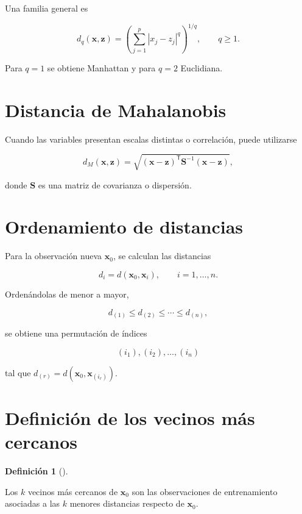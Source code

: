 \documentclass[
  spanish,
  11pt,
  letterpaper,
  DIV=11,
  numbers=noendperiod]{scrreprt}
\theoremstyle{definition}
\newtheorem{definition}{Definición}[chapter]
\theoremstyle{plain}
\theoremstyle{definition}
\theoremstyle{remark}
\begin{document}
Una familia general es

\[
d_q(\mathbf{x},\mathbf{z})
=
\left(
\sum_{j=1}^{p}|x_j-z_j|^q
\right)^{1/q},
\qquad q\ge 1.
\]

Para \(q=1\) se obtiene Manhattan y para \(q=2\) Euclidiana.

\section{Distancia de Mahalanobis}\label{distancia-de-mahalanobis}

Cuando las variables presentan escalas distintas o correlación, puede
utilizarse

\[
d_M(\mathbf{x},\mathbf{z})
=
\sqrt{
(\mathbf{x}-\mathbf{z})^{\mathsf T}
\mathbf{S}^{-1}
(\mathbf{x}-\mathbf{z})
},
\]

donde \(\mathbf{S}\) es una matriz de covarianza o dispersión.

\section{Ordenamiento de distancias}\label{ordenamiento-de-distancias}

Para la observación nueva \(\mathbf{x}_0\), se calculan las distancias

\[
d_i=d(\mathbf{x}_0,\mathbf{x}_i),
\qquad i=1,\ldots,n.
\]

Ordenándolas de menor a mayor,

\[
d_{(1)}\le d_{(2)}\le\cdots\le d_{(n)},
\]

se obtiene una permutación de índices

\[
(i_1),(i_2),\ldots,(i_n)
\]

tal que \(d_{(r)}=d(\mathbf{x}_0,\mathbf{x}_{(i_r)})\).

\section{Definición de los vecinos más
cercanos}\label{definiciuxf3n-de-los-vecinos-muxe1s-cercanos}

\begin{definition}[]\protect\hypertarget{def-vecinos}{}\label{def-vecinos}

Los \(k\) vecinos más cercanos de \(\mathbf{x}_0\) son las observaciones
de entrenamiento asociadas a las \(k\) menores distancias respecto de
\(\mathbf{x}_0\).

\end{definition}
\end{document}
